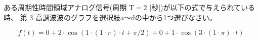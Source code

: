 ある周期性時間領域アナログ信号(周期 $\textrm{T} = 2$ [秒])が以下の式で与えられている時、
第 3 高調波波のグラフを選択肢a〜dの中から1つ選びなさい。

\[
f(t) = 
0
+ 2 \cdot \cos( 1 \cdot ( 1 \cdot \pi ) \cdot t + \pi/2)
+ 0
+ 1 \cdot \cos( 3 \cdot ( 1 \cdot \pi ) \cdot t )
\]
